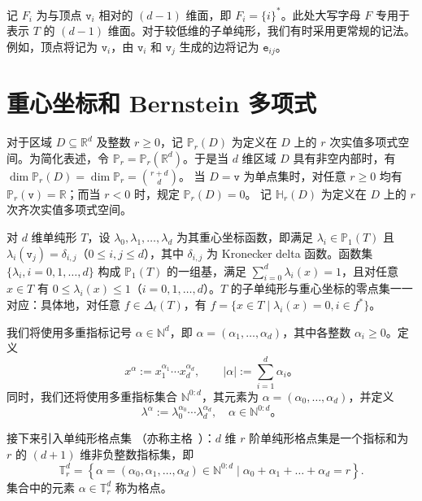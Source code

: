 记 $F_{i}$ 为与顶点 $\texttt{v}_i$ 相对的 $(d-1)$ 维面，即 $F_i = \{i\}^*$。此处大写字母 $F$ 专用于表示 $T$ 的 $(d-1)$ 维面。对于较低维的子单纯形，我们有时采用更常规的记法。例如，顶点将记为 $\texttt{v}_i$，由 $\texttt{v}_i$ 和 $\texttt{v}_j$ 生成的边将记为 $\texttt{e}_{ij}$。






\section{重心坐标和 Bernstein 多项式}
对于区域 $D \subseteq \mathbb{R}^{d}$ 及整数 $r \geqslant 0$，记 $\mathbb{P}_{r}(D)$ 为定义在 $D$ 上的 $r$ 次实值多项式空间。为简化表述，令 $\mathbb{P}_{r}=\mathbb{P}_{r}\left(\mathbb{R}^{d}\right)$。于是当 $d$ 维区域 $D$ 具有非空内部时，有 $\operatorname{dim} \mathbb{P}_{r}(D)=\operatorname{dim} \mathbb{P}_{r}=\displaystyle{r+d \choose d}$。
当 $D = {\texttt{v}}$ 为单点集时，对任意 $r \geqslant 0$ 均有 $\mathbb{P}_{r}(\texttt{v})=\mathbb{R}$；而当 $r<0$ 时，规定 $\mathbb{P}_{r}(D)= {0}$。
记 $\mathbb{H}_{r}(D)$ 为定义在 $D$ 上的 $r$ 次齐次实值多项式空间。

对 $d$ 维单纯形 $T$，设 $\lambda_{0}, \lambda_{1}, \ldots, \lambda_{d}$ 为其重心坐标函数，即满足 $\lambda_{i} \in \mathbb{P}_{1}(T)$ 且 $\lambda_{i}\left(\texttt{v}_j\right)=\delta_{i,j}$（$0 \leqslant i, j \leqslant d$），其中 $\delta_{i,j}$ 为 Kronecker delta 函数。函数集 $\{\lambda_{i}, i=0,1,\ldots, d\}$ 构成 $\mathbb{P}_{1}(T)$ 的一组基，满足 $\sum_{i=0}^d\lambda_i (x)= 1$，且对任意 $x\in T$ 有 $0\leq \lambda_i(x)\leq 1$（$i=0,1,\ldots,d$）。$T$ 的子单纯形与重心坐标的零点集一一对应：具体地，对任意 $f\in \Delta_{\ell}(T)$，有 $f = \{x\in T\mid \lambda_i(x) = 0, i\in f^*\}$。

我们将使用多重指标记号 $\alpha \in \mathbb{N}^{d}$，即 $\alpha=(\alpha_1, \dots, \alpha_d)$，其中各整数 $\alpha_i \ge 0$。定义
\[
x^\alpha := x_1^{\alpha_1} \cdots x_d^{\alpha_d}, \qquad |\alpha| := \sum_{i=1}^d \alpha_i。
\]
同时，我们还将使用多重指标集合 $\mathbb{N}^{0:d}$，其元素为 $\alpha = (\alpha_0, \dots, \alpha_d)$，并定义
\[
\lambda^\alpha := \lambda_0^{\alpha_0} \cdots \lambda_d^{\alpha_d}, \quad \alpha \in \mathbb{N}^{0:d}。
\]

接下来引入单纯形格点集 \cite{Chen;Huang:2022FEMcomplex3D,ChenHuang2021Cmgeodecomp}（亦称主格~\cite{nicolaides1973class}）：$d$ 维 $r$ 阶单纯形格点集是一个指标和为 $r$ 的 $(d+1)$ 维非负整数指标集，即
\[
\mathbb T^{d}_r = \left \{ \alpha = (\alpha_0, \alpha_1, \ldots, \alpha_d)\in\mathbb N^{0:d} \mid \alpha_0 + \alpha_1 + \ldots + \alpha_d = r \right \}.
\]
集合中的元素 $\alpha \in \mathbb{T}^d_r$ 称为格点。

